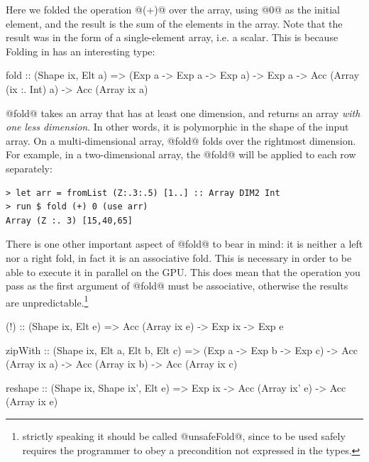 Here we folded the operation @(+)@ over the array, using @0@ as the
initial element, and the result is the sum of the elements in the
array.  Note that the result was in the form of a single-element
array, i.e. a scalar.  This is because Folding in \acc{} has an
interesting type:

\begin{haskell}
fold :: (Shape ix, Elt a)
     => (Exp a -> Exp a -> Exp a)
     -> Exp a -> Acc (Array (ix :. Int) a) -> Acc (Array ix a)
\end{haskell}

\noindent @fold@ takes an array that has at least one dimension, and
returns an array \emph{with one less dimension}.  In other words, it
is polymorphic in the shape of the input array.  On a
multi-dimensional array, @fold@ folds over the rightmost dimension.
For example, in a two-dimensional array, the @fold@ will be applied
to each row separately:

\begin{verbatim}
> let arr = fromList (Z:.3:.5) [1..] :: Array DIM2 Int
> run $ fold (+) 0 (use arr)
Array (Z :. 3) [15,40,65]
\end{verbatim}

There is one other important aspect of @fold@ to bear in mind: it is
neither a left nor a right fold, in fact it is an associative fold.
This is necessary in order to be able to execute it in parallel on the
GPU.  This does mean that the operation you pass as the first argument
of @fold@ must be associative, otherwise the results are
unpredictable.\footnote{strictly speaking it should be called
  @unsafeFold@, since to be used safely requires the programmer to
  obey a precondition not expressed in the types.}


\begin{haskell}
(!) :: (Shape ix, Elt e) => Acc (Array ix e) -> Exp ix -> Exp e
\end{haskell}

\begin{haskell}
zipWith :: (Shape ix, Elt a, Elt b, Elt c)
        => (Exp a -> Exp b -> Exp c)
        -> Acc (Array ix a) -> Acc (Array ix b)
        -> Acc (Array ix c)
\end{haskell}

\begin{haskell}
reshape :: (Shape ix, Shape ix', Elt e)
        => Exp ix -> Acc (Array ix' e)
        -> Acc (Array ix e)
\end{haskell}

